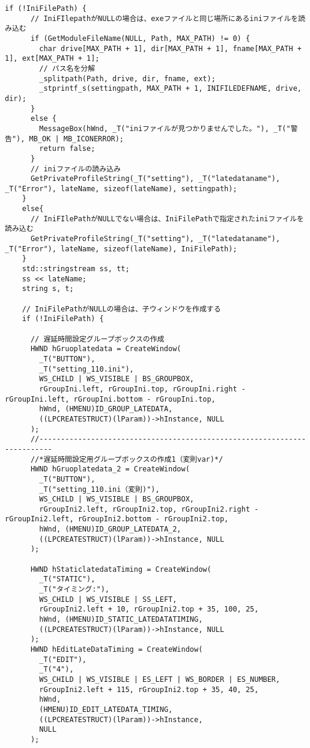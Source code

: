 \begin{lstlisting}[caption=window.cpp]
    if (!IniFilePath) {
      // IniFIlepathがNULLの場合は、exeファイルと同じ場所にあるiniファイルを読み込む
      if (GetModuleFileName(NULL, Path, MAX_PATH) != 0) {
        char drive[MAX_PATH + 1], dir[MAX_PATH + 1], fname[MAX_PATH + 1], ext[MAX_PATH + 1];
        // パス名を分解
        _splitpath(Path, drive, dir, fname, ext);
        _stprintf_s(settingpath, MAX_PATH + 1, INIFILEDEFNAME, drive, dir);
      }
      else {
        MessageBox(hWnd, _T("iniファイルが見つかりませんでした。"), _T("警告"), MB_OK | MB_ICONERROR);
        return false;
      }
      // iniファイルの読み込み
      GetPrivateProfileString(_T("setting"), _T("latedataname"), _T("Error"), lateName, sizeof(lateName), settingpath);
    }
    else{
      // IniFIlePathがNULLでない場合は、IniFilePathで指定されたiniファイルを読み込む
      GetPrivateProfileString(_T("setting"), _T("latedataname"), _T("Error"), lateName, sizeof(lateName), IniFilePath);
    }
    std::stringstream ss, tt;
    ss << lateName;
    string s, t;

    // IniFilePathがNULLの場合は、子ウィンドウを作成する
    if (!IniFilePath) {

      // 遅延時間設定グループボックスの作成
      HWND hGruoplatedata = CreateWindow(
        _T("BUTTON"),
        _T("setting_110.ini"),
        WS_CHILD | WS_VISIBLE | BS_GROUPBOX,
        rGroupIni.left, rGroupIni.top, rGroupIni.right - rGroupIni.left, rGroupIni.bottom - rGroupIni.top,
        hWnd, (HMENU)ID_GROUP_LATEDATA,
        ((LPCREATESTRUCT)(lParam))->hInstance, NULL
      );
      //-------------------------------------------------------------------------
      //*遅延時間設定用グループボックスの作成1（変則var)*/
      HWND hGruoplatedata_2 = CreateWindow(
        _T("BUTTON"),
        _T("setting_110.ini（変則)"),
        WS_CHILD | WS_VISIBLE | BS_GROUPBOX,
        rGroupIni2.left, rGroupIni2.top, rGroupIni2.right - rGroupIni2.left, rGroupIni2.bottom - rGroupIni2.top,
        hWnd, (HMENU)ID_GROUP_LATEDATA_2,
        ((LPCREATESTRUCT)(lParam))->hInstance, NULL
      );

      HWND hStaticlatedataTiming = CreateWindow(
        _T("STATIC"),
        _T("タイミング:"),
        WS_CHILD | WS_VISIBLE | SS_LEFT,
        rGroupIni2.left + 10, rGroupIni2.top + 35, 100, 25,
        hWnd, (HMENU)ID_STATIC_LATEDATATIMING,
        ((LPCREATESTRUCT)(lParam))->hInstance, NULL
      );
      HWND hEditLateDataTiming = CreateWindow(
        _T("EDIT"),
        _T("4"),
        WS_CHILD | WS_VISIBLE | ES_LEFT | WS_BORDER | ES_NUMBER,
        rGroupIni2.left + 115, rGroupIni2.top + 35, 40, 25,
        hWnd,
        (HMENU)ID_EDIT_LATEDATA_TIMING,
        ((LPCREATESTRUCT)(lParam))->hInstance,
        NULL
      );


\end{lstlisting}
